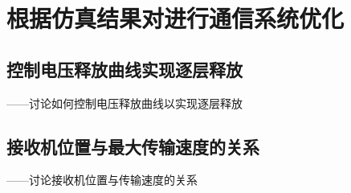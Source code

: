\chapter{根据仿真结果对进行通信系统优化}

\section{控制电压释放曲线实现逐层释放}
——讨论如何控制电压释放曲线以实现逐层释放

\section{接收机位置与最大传输速度的关系}
——讨论接收机位置与传输速度的关系